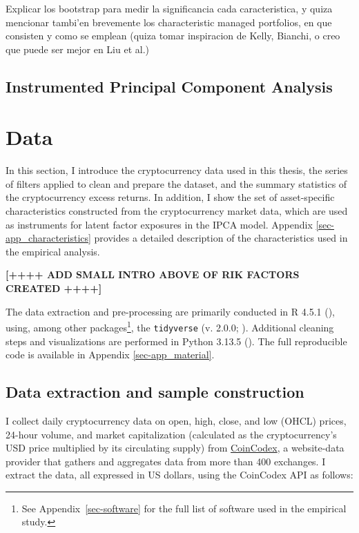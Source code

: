 \documentclass[
  12pt,
  a4paper,
  openany]{scrbook}
\begin{document}
Explicar los bootstrap para medir la significancia cada caracteristica,
y quiza mencionar tambi'en brevemente los characteristic managed
portfolios, en que consisten y como se emplean (quiza tomar inspiracion
de Kelly, Bianchi, o creo que puede ser mejor en Liu et al.)

\section{Instrumented Principal Component
Analysis}\label{instrumented-principal-component-analysis}


\chapter{Data}\label{sec-data}

In this section, I introduce the cryptocurrency data used in this
thesis, the series of filters applied to clean and prepare the dataset,
and the summary statistics of the cryptocurrency excess returns. In
addition, I show the set of asset-specific characteristics constructed
from the cryptocurrency market data, which are used as instruments for
latent factor exposures in the IPCA model. Appendix
\ref{sec-app_characteristics} provides a detailed description of the
characteristics used in the empirical analysis.

\textbf{{[}++++ ADD SMALL INTRO ABOVE OF RIK FACTORS CREATED ++++{]}}

The data extraction and pre-processing are primarily conducted in R
4.5.1 (), using, among other
packages\footnote{See Appendix~\ref{sec-software} for the full list of
  software used in the empirical study.}, the \texttt{tidyverse} (v.
2.0.0; ). Additional
cleaning steps and visualizations are performed in Python 3.13.5
(). The full
reproducible code is available in Appendix \ref{sec-app_material}.

\section{Data extraction and sample
construction}\label{data-extraction-and-sample-construction}

I collect daily cryptocurrency data on open, high, close, and low (OHCL)
prices, 24-hour volume, and market capitalization (calculated as the
cryptocurrency's USD price multiplied by its circulating supply) from
\href{https://coincodex.com/}{CoinCodex}, a website-data provider that
gathers and aggregates data from more than 400 exchanges. I extract the
data, all expressed in US dollars, using the CoinCodex API as follows:
\end{document}
